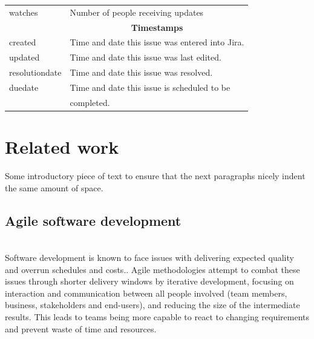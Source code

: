 \documentclass[sigconf]{acmart}
\begin{document}
\begin{table}[h!]
\begin{tabular}{l l}
 watches & Number of people receiving updates \\
  & \multicolumn{1}{c}{\textbf{Timestamps}} \\
 created & Time and date this issue was entered into Jira. \\
 updated & Time and date this issue was last edited. \\
 resolutiondate & Time and date this issue was resolved. \\
 duedate & Time and date this issue is scheduled to be \\
 & completed. \\ [2ex] 
 \hline
 \end{tabular}
\end{table}

\section{Related work} 
Some introductory piece of text to ensure that the next paragraphs nicely indent the same amount of space. \\

\subsection{Agile software development} \\
Software development is known to face issues with delivering expected quality and overrun schedules and costs.\cite{dingsoyr2021managing}. 
Agile methodologies attempt to combat these issues through shorter delivery windows by iterative development, focusing on interaction and communication between all people involved (team members, business, stakeholders and end-users), and reducing the size of the intermediate results. 
This leads to teams being more capable to react to changing requirements and prevent waste of time and resources.\cite{cohen2004introduction}
\end{document}
